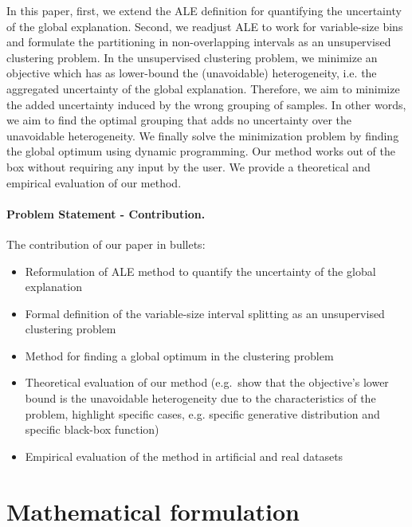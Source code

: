 \documentclass{article}
\begin{document}
In this paper, first, we extend the ALE definition for quantifying the uncertainty of the global explanation. Second, we readjust ALE to work for variable-size bins and formulate the partitioning in non-overlapping intervals as an unsupervised clustering problem. In the unsupervised clustering problem, we minimize an objective which has as lower-bound the (unavoidable) heterogeneity, i.e. the aggregated uncertainty of the global explanation. Therefore, we aim to minimize the added uncertainty induced by the wrong grouping of samples. In other words, we aim to find the optimal grouping that adds no uncertainty over the unavoidable heterogeneity. We finally solve the minimization problem by finding the global optimum using dynamic programming. Our method works out of the box without requiring any input by the user. We provide a theoretical and empirical evaluation of our method.

\paragraph{Problem Statement - Contribution.} The contribution of our
paper in bullets:

\begin{itemize}
\item Reformulation of ALE method to quantify the uncertainty of the
  global explanation
\item Formal definition of the variable-size interval splitting as an
  unsupervised clustering problem
\item Method for finding a global optimum in the clustering
  problem
\item Theoretical evaluation of our method (e.g.~show that the
  objective's lower bound is the unavoidable heterogeneity due to the
  characteristics of the problem, highlight specific cases,
  e.g. specific generative distribution and specific black-box function)
\item Empirical evaluation of the method in artificial and real
  datasets
\end{itemize}

\section{Mathematical formulation}
\end{document}
